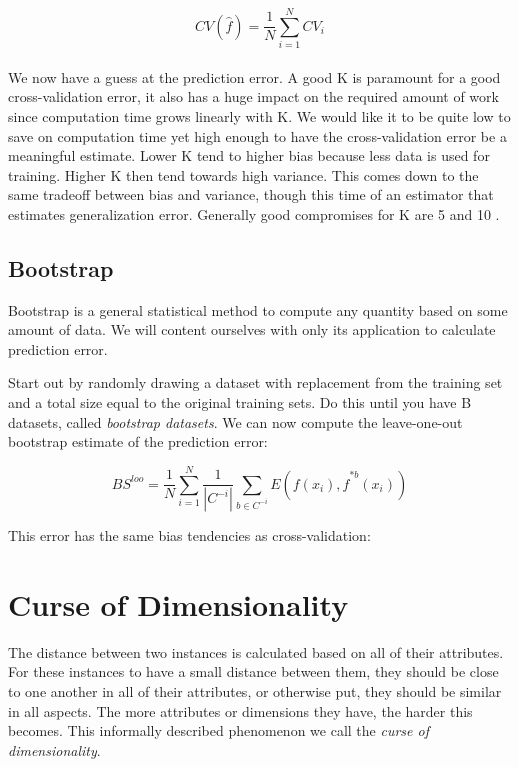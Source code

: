$$
CV(\hat{f}) = \frac{1}{N} \sum^{N}_{i=1} CV_i
$$

\paragraph{}
We now have a guess at the prediction error.
A good K is paramount for a good cross-validation error,
it also has a huge impact on the required amount of work
since computation time grows linearly with K.
We would like it to be quite low to save on computation time
yet high enough to have the cross-validation error
be a meaningful estimate.
Lower K tend to higher bias
because less data is used for training.
Higher K then tend towards
high variance.
This comes down to the same tradeoff between
bias and variance,
though this time of an estimator
that estimates generalization error.
Generally good compromises for K are 5 and 10
\parencite{kohavi1995study}.


\subsection{Bootstrap}
Bootstrap is a general statistical method
to compute any quantity based on
some amount of data.
We will content ourselves with only
its application
to calculate prediction error.

Start out by randomly drawing a dataset
with replacement from the training set
and a total size equal to the original
training sets.
Do this until you have B datasets,
called \textit{bootstrap datasets}.
We can now compute
the leave-one-out bootstrap estimate
of the prediction error:

$$
BS^{loo}= \frac{1}{N} \sum^{N}_{i=1} \frac{1}{|C^{-i}|} \sum_{b \in C ^ {-i}} E(f(x_i), \hat{f}^{*b}(x_i))
$$

This error has the same bias tendencies as cross-validation:


\section{Curse of Dimensionality}
The distance between two instances is calculated based on all of their attributes.
For these instances to have a small distance between them,
they should be close to one another in all of their attributes,
or otherwise put,
they should be similar in all aspects.
The more attributes or dimensions they have,
the harder this becomes.
This informally described phenomenon we call
the \textit{curse of dimensionality}.

